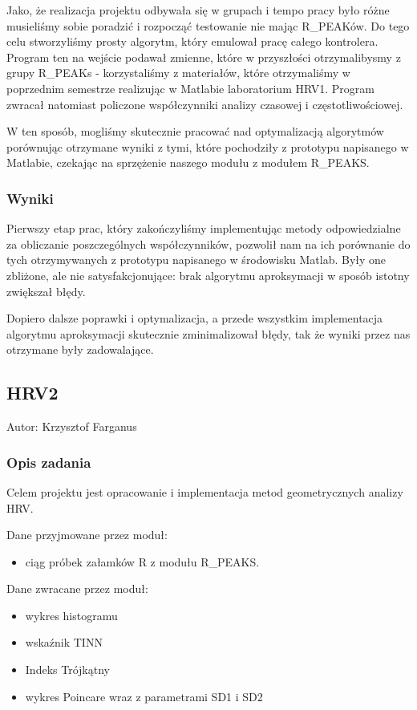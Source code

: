 \documentclass[a4paper, 11pt]{article}
\begin{document}
Jako, że realizacja projektu odbywała się w grupach i tempo pracy było różne musieliśmy sobie poradzić i rozpocząć testowanie nie mając R\_PEAKów. Do tego celu stworzyliśmy prosty algorytm, który emulował pracę całego kontrolera. Program ten na wejście podawał zmienne, które w przyszłości otrzymalibysmy z grupy R\_PEAKs - korzystaliśmy z materiałów, które otrzymaliśmy w poprzednim semestrze realizując w Matlabie laboratorium HRV1. Program zwracał natomiast policzone współczynniki analizy czasowej i częstotliwościowej.

W ten sposób, mogliśmy skutecznie pracować nad optymalizacją algorytmów porównując otrzymane wyniki z tymi, które pochodziły z prototypu napisanego w Matlabie, czekając na sprzężenie naszego modułu z modułem R\_PEAKS.

\subsubsection{Wyniki}
\label{sec:hrv1:results}
Pierwszy etap prac, który zakończyliśmy implementując metody odpowiedzialne za obliczanie poszczególnych współczynników, pozwolił nam na ich porównanie do tych otrzymywanych z prototypu napisanego w środowisku Matlab. Były one zbliżone, ale nie satysfakcjonujące: brak algorytmu aproksymacji w sposób istotny zwiększał błędy.

Dopiero dalsze poprawki i optymalizacja, a przede wszystkim implementacja algorytmu aproksymacji skutecznie zminimalizował błędy, tak że wyniki przez nas otrzymane były zadowalające.


\subsection{HRV2}
\label{sec:hrv2}

Autor: Krzysztof Farganus


\subsubsection{Opis zadania}
\label{sec:hrv2:desc}

Celem projektu jest opracowanie i implementacja metod geometrycznych
analizy HRV.

Dane przyjmowane przez moduł: 
\begin{itemize}
\item ciąg próbek załamków R z modułu R\_PEAKS.
\end{itemize}
Dane zwracane przez moduł:
\begin{itemize}
\item wykres histogramu 
\item wskaźnik TINN 
\item Indeks Trójkątny
\item wykres Poincare wraz z parametrami SD1 i SD2
\end{itemize}
\end{document}
